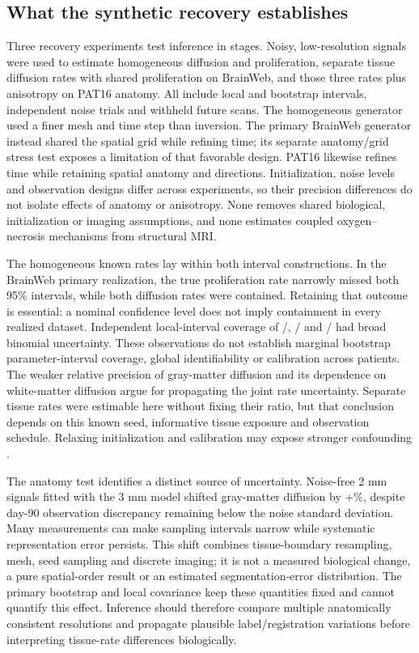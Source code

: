 \subsection{What the synthetic recovery establishes}
Three recovery experiments test inference in stages. Noisy, low-resolution signals were used to estimate homogeneous diffusion and proliferation, separate tissue diffusion rates with shared proliferation on BrainWeb, and those three rates plus anisotropy on PAT16 anatomy. All include local and bootstrap intervals, independent noise trials and withheld future scans. The homogeneous generator used a finer mesh and time step than inversion. The primary BrainWeb generator instead shared the spatial grid while refining time; its separate anatomy/grid stress test exposes a limitation of that favorable design. PAT16 likewise refines time while retaining spatial anatomy and directions. Initialization, noise levels and observation designs differ across experiments, so their precision differences do not isolate effects of anatomy or anisotropy. None removes shared biological, initialization or imaging assumptions, and none estimates coupled oxygen--necrosis mechanisms from structural MRI.

The homogeneous known rates lay within both interval constructions. In the BrainWeb primary realization, the true proliferation rate narrowly missed both 95\% intervals, while both diffusion rates were contained. Retaining that outcome is essential: a nominal confidence level does not imply containment in every realized dataset. Independent local-interval coverage of \BWWhiteCoverage/\BWTrials{}, \BWGrayCoverage/\BWTrials{} and \BWRhoCoverage/\BWTrials{} had broad binomial uncertainty. These observations do not establish marginal bootstrap parameter-interval coverage, global identifiability or calibration across patients. The weaker relative precision of gray-matter diffusion and its dependence on white-matter diffusion argue for propagating the joint rate uncertainty. Separate tissue rates were estimable here without fixing their ratio, but that conclusion depends on this known seed, informative tissue exposure and observation schedule. Relaxing initialization and calibration may expose stronger confounding \citep{hiremath2025}.

The anatomy test identifies a distinct source of uncertainty. Noise-free 2 mm signals fitted with the 3 mm model shifted gray-matter diffusion by +\BWGrayStressShift\%, despite day-90 observation discrepancy remaining below the noise standard deviation. Many measurements can make sampling intervals narrow while systematic representation error persists. This shift combines tissue-boundary resampling, mesh, seed sampling and discrete imaging; it is not a measured biological change, a pure spatial-order result or an estimated segmentation-error distribution. The primary bootstrap and local covariance keep these quantities fixed and cannot quantify this effect. Inference should therefore compare multiple anatomically consistent resolutions and propagate plausible label/registration variations before interpreting tissue-rate differences biologically.

